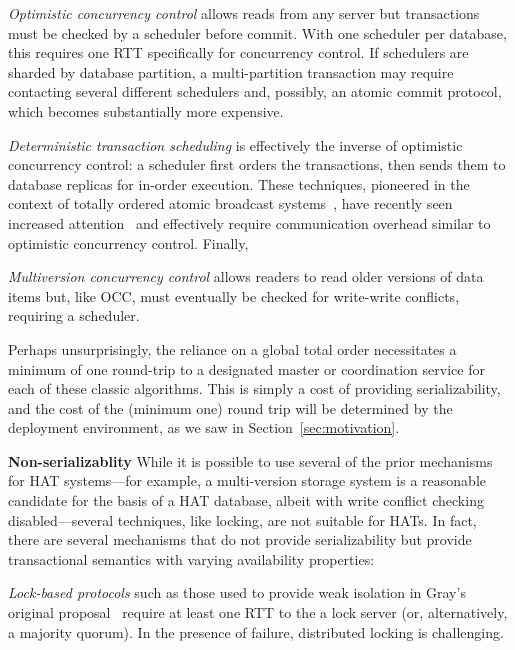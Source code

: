 \vspace{.5em}\noindent\textit{Optimistic concurrency control} allows
reads from any server but transactions must be checked by a scheduler
before commit. With one scheduler per database, this requires one RTT
specifically for concurrency control. If schedulers are sharded by
database partition, a multi-partition transaction may require
contacting several different schedulers and, possibly, an atomic
commit protocol, which becomes substantially more
expensive.

\vspace{.5em}\noindent\textit{Deterministic transaction scheduling} is
effectively the inverse of optimistic concurrency control: a scheduler
first orders the transactions, then sends them to database replicas
for in-order execution. These techniques, pioneered in the context of
totally ordered atomic broadcast
systems~\cite{deterministic-scheduling}, have recently seen increased
attention~\cite{calvin} and effectively require communication overhead
similar to optimistic concurrency control. Finally,

\vspace{.5em}\noindent\textit{Multiversion concurrency control} allows readers to read older
versions of data items but, like OCC, must eventually be checked for
write-write conflicts, requiring a scheduler.

\vspace{.5em} Perhaps unsurprisingly, the reliance on a global total
order necessitates a minimum of one round-trip to a designated master
or coordination service for each of these classic algorithms. This is
simply a cost of providing serializability, and the cost of the
(minimum one) round trip will be determined by the deployment
environment, as we saw in Section~\ref{sec:motivation}.

\vspace{.5em}\noindent\textbf{Non-serializablity} While it is possible to use
several of the prior mechanisms for HAT systems---for example, a
multi-version storage system is a reasonable candidate for the basis
of a HAT database, albeit with write conflict checking
disabled---several techniques, like locking, are not suitable for
HATs. In fact, there are several mechanisms that do not provide
serializability but provide transactional semantics with varying
availability properties:

\vspace{.5em}\noindent\textit{Lock-based protocols} such as those used to provide weak
  isolation in Gray's original proposal~\cite{gray-isolation} require
  at least one RTT to the a lock server (or, alternatively, a majority
  quorum). In the presence of failure, distributed locking is
  challenging.

